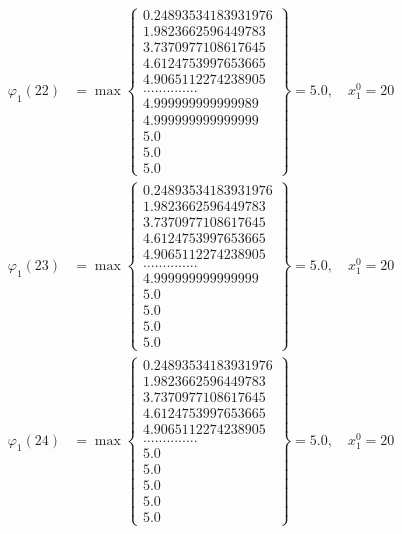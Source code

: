 \documentclass{article}
\begin{document}
\begin{align*}
  
  
  
\varphi_{1}(22) &= \max \left\{ \begin{array}{c}
0.24893534183931976 \\
 1.9823662596449783 \\
 3.7370977108617645 \\
 4.6124753997653665 \\
 4.9065112274238905 \\
 .............. \\
 4.999999999999989 \\
 4.999999999999999 \\
 5.0 \\
 5.0 \\
 5.0
\end{array} \right\} = 5.0, \quad x_{1}^0 = 20\\
  
  
  
  
\varphi_{1}(23) &= \max \left\{ \begin{array}{c}
0.24893534183931976 \\
 1.9823662596449783 \\
 3.7370977108617645 \\
 4.6124753997653665 \\
 4.9065112274238905 \\
 .............. \\
 4.999999999999999 \\
 5.0 \\
 5.0 \\
 5.0 \\
 5.0
\end{array} \right\} = 5.0, \quad x_{1}^0 = 20\\
  
  
  
  
\varphi_{1}(24) &= \max \left\{ \begin{array}{c}
0.24893534183931976 \\
 1.9823662596449783 \\
 3.7370977108617645 \\
 4.6124753997653665 \\
 4.9065112274238905 \\
 .............. \\
 5.0 \\
 5.0 \\
 5.0 \\
 5.0 \\
 5.0
\end{array} \right\} = 5.0, \quad x_{1}^0 = 20\\
  

\end{align*}
\end{document}
